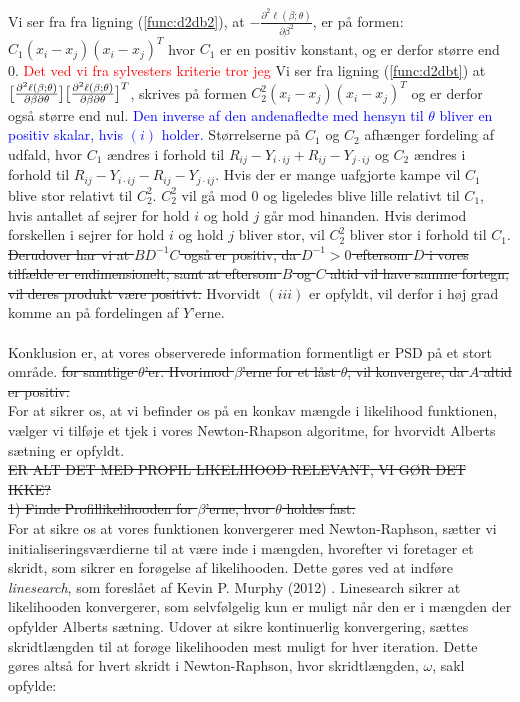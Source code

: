 \documentclass[11pt,a4paper]{article}
\begin{document}
Vi ser fra fra ligning (\ref{func:d2db2}), at $-\frac{\partial^2 \ell(\beta;\theta)}{\partial \beta^2}$, er på formen: $C_1(x_i-x_j)(x_i-x_j)^T$ hvor $C_1$ er en positiv konstant, og er derfor større end 0. \textcolor{red}{Det ved vi fra sylvesters kriterie tror jeg}
Vi ser fra ligning (\ref{func:d2dbt}) at $\big{[}\frac{\partial^2 \ell(\beta;\theta)}{\partial \beta \partial \theta}\big{]}\big{[}\frac{\partial^2 \ell(\beta;\theta)}{\partial \beta \partial \theta}\big{]}^T$, skrives på formen $C_2^2(x_i-x_j)(x_i-x_j)^T$ og er derfor også større end nul. \textcolor{blue}{ Den inverse af den andenafledte med hensyn til $\theta$ bliver en positiv skalar, hvis $(i)$ holder.} Størrelserne på $C_1$ og $C_2$ afhænger fordeling af udfald, hvor $C_1$ ændres i forhold til $R_{ij}-Y_{i\cdot ij} + R_{ij}-Y_{j\cdot ij}$ og $C_2$ ændres i forhold til $R_{ij}-Y_{i\cdot ij} - R_{ij}-Y_{j\cdot ij}$. Hvis der er mange uafgjorte kampe vil $C_1$ blive stor relativt til $C_2^2$. $C_2^2$ vil gå mod 0 og ligeledes blive lille relativt til $C_1$, hvis antallet af sejrer for hold $i$ og hold $j$ går mod hinanden. Hvis derimod forskellen i sejrer for hold $i$ og hold $j$ bliver stor, vil $C_2^2$ bliver stor i forhold til $C_1$. \sout{ Derudover har vi at $BD^{-1}C$ også er positiv, da $D^{-1}>0$ eftersom $D$ i vores tilfælde er endimensionelt, samt at eftersom $B$ og $C$ altid vil have samme fortegn, vil deres produkt være positivt.} Hvorvidt $(iii)$ er opfyldt, vil derfor i høj grad komme an på fordelingen af $Y$'erne. \\\\
Konklusion er, at vores observerede information formentligt er PSD på et stort område. \sout{for samtlige $\theta$'er. Hvorimod $\beta$'erne for et låst $\theta$, vil konvergere, da $A$ altid er positiv.}\\
For at sikrer os, at vi befinder os på en konkav mængde i likelihood funktionen, vælger vi tilføje et tjek i vores Newton-Rhapson algoritme, for hvorvidt Alberts sætning er opfyldt. \\
\sout{ER ALT DET MED PROFIL LIKELIHOOD RELEVANT, VI GØR DET IKKE?\\
1) Finde Profillikelihooden for $\beta$'erne, hvor $\theta$ holdes fast.}\\
For at sikre os at vores funktionen konvergerer med Newton-Raphson, sætter vi initialiseringsværdierne til at være inde i mængden, hvorefter vi foretager et skridt, som sikrer en forøgelse af likelihooden. Dette gøres ved at indføre \textit{linesearch}, som foreslået af Kevin P. Murphy (2012) \cite{LineSearch}. Linesearch sikrer at likelihooden konvergerer, som selvfølgelig kun er muligt når den er i mængden der opfylder Alberts sætning. Udover at sikre kontinuerlig konvergering, sættes skridtlængden til at forøge likelihooden mest muligt for hver iteration. Dette gøres altså for hvert skridt i Newton-Raphson, hvor skridtlængden, $\omega$, sakl opfylde:\\
\end{document}
